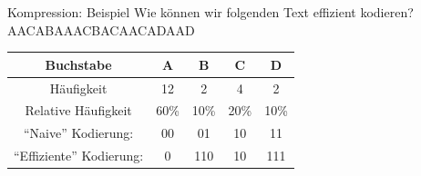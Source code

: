 \begin{frame}{Kompression: Beispiel}
	\centering
	Wie können wir folgenden Text effizient kodieren?\\[.5cm]
	AACABAAACBACAACADAAD
	
	\begin{table}[H]
		\begin{tabular}{c|c|c|c|c}
			\textbf{Buchstabe} & \textbf{A} & \textbf{B} & \textbf{C} & \textbf{D} \\\midrule\midrule
			Häufigkeit & 12 &  2 & 4 & 2 \\\hline
			Relative Häufigkeit & 60\% & 10\% & 20\% & 10\% \\\hline
			\enquote{Naive} Kodierung: & 00 & 01 & 10 & 11 \\\hline
			\enquote{Effiziente} Kodierung: & 0 & 110  & 10&  111\\
		\end{tabular}

	\end{table}
\end{frame}

